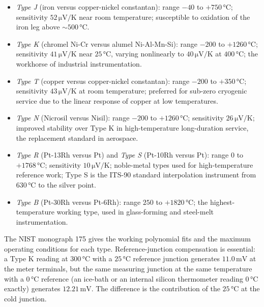 \begin{itemize}[leftmargin=*]
  \item \textit{Type J} (iron versus copper-nickel constantan):
    range $-40$ to $+750\,\si{\degreeCelsius}$; sensitivity
    $52\,\si{\micro\volt\per\kelvin}$ near room temperature;
    susceptible to oxidation of the iron leg above
    $\sim 500\,\si{\degreeCelsius}$.
  \item \textit{Type K} (chromel Ni-Cr versus alumel Ni-Al-Mn-Si):
    range $-200$ to $+1260\,\si{\degreeCelsius}$; sensitivity
    $41\,\si{\micro\volt\per\kelvin}$ near $25\,\si{\degreeCelsius}$,
    varying nonlinearly to $40\,\si{\micro\volt\per\kelvin}$ at
    $400\,\si{\degreeCelsius}$; the workhorse of industrial
    instrumentation.
  \item \textit{Type T} (copper versus copper-nickel constantan):
    range $-200$ to $+350\,\si{\degreeCelsius}$; sensitivity
    $43\,\si{\micro\volt\per\kelvin}$ at room temperature;
    preferred for sub-zero cryogenic service due to the linear
    response of copper at low temperatures.
  \item \textit{Type N} (Nicrosil versus Nisil): range $-200$ to
    $+1260\,\si{\degreeCelsius}$; sensitivity $26\,\si{\micro
    \volt\per\kelvin}$; improved stability over Type K in
    high-temperature long-duration service, the replacement
    standard in aerospace.
  \item \textit{Type R} (Pt-13Rh versus Pt) and \textit{Type S}
    (Pt-10Rh versus Pt): range $0$ to $+1768\,\si{\degreeCelsius}$;
    sensitivity $10\,\si{\micro\volt\per\kelvin}$; noble-metal
    types used for high-temperature reference work; Type S is the
    ITS-90 standard interpolation instrument from $630\,\si{
    \degreeCelsius}$ to the silver point.
  \item \textit{Type B} (Pt-30Rh versus Pt-6Rh): range $250$ to
    $+1820\,\si{\degreeCelsius}$; the highest-temperature working
    type, used in glass-forming and steel-melt instrumentation.
\end{itemize}
The NIST monograph 175 \cite{paper:ch05-nist-thermocouple-tables}
gives the working polynomial fits and the maximum operating
conditions for each type. Reference-junction compensation
is essential: a Type K reading at $300\,\si{\degreeCelsius}$ with
a $25\,\si{\degreeCelsius}$ reference junction generates $11.0\,\si{
\milli\volt}$ at the meter terminals, but the same measuring
junction at the same temperature with a $0\,\si{\degreeCelsius}$
reference (an ice-bath or an internal silicon thermometer
reading $0\,\si{\degreeCelsius}$ exactly) generates $12.21\,\si{
\milli\volt}$. The difference is the contribution of the
$25\,\si{\degreeCelsius}$ at the cold junction.

